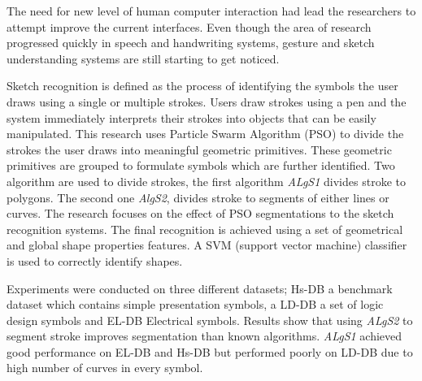 \documentclass[11pt,doublespace]{Sketchthesis}
\begin{document}
\begin{abstractpage}          


The need for new level of human computer interaction had lead the researchers to attempt improve the current interfaces. Even though the area of research progressed quickly in speech and handwriting systems, gesture and sketch understanding systems are still starting to get noticed. 


Sketch recognition is defined as the process of identifying the symbols the user draws using a single or multiple strokes. Users draw strokes using a pen and the system immediately interprets their strokes into objects that can be easily manipulated. This research uses Particle Swarm Algorithm (PSO) to divide the strokes the user draws into meaningful geometric primitives. These geometric primitives are grouped to formulate symbols which are further identified. Two algorithm are used to divide strokes, the first algorithm \textit{ALgS1} divides stroke to polygons. The second one \textit{AlgS2}, divides stroke to segments of either lines or curves. The research focuses on the effect of PSO segmentations to the sketch recognition systems. The final recognition is achieved using a set of geometrical and global shape properties features. A SVM (support vector machine) classifier is used to correctly identify shapes. 

Experiments were conducted on three different datasets; Hs-DB a benchmark dataset which contains simple presentation symbols, a LD-DB a set of logic design symbols and EL-DB Electrical symbols. Results show that using \textit{ALgS2} to segment stroke improves segmentation than known algorithms. \textit{ALgS1} achieved good performance on EL-DB and Hs-DB but performed poorly on LD-DB due to high number of curves in every symbol. %

\end{abstractpage}                              %
\end{document}
